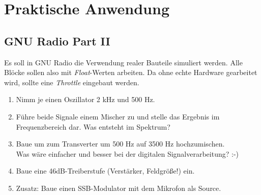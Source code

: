 \section{Praktische Anwendung}

\subsection{GNU Radio Part II}

Es soll in GNU Radio die Verwendung realer Bauteile simuliert werden. Alle
Blöcke sollen also mit \emph{Float}-Werten arbeiten. Da ohne echte Hardware
gearbeitet wird, sollte eine \emph{Throttle} eingebaut werden.

\begin{enumerate}
    \item Nimm je einen Oszillator 2 kHz und 500 Hz.
    \item Führe beide Signale einem Mischer zu und stelle das Ergebnis im
          Frequenzbereich dar. Was entsteht im Spektrum?
    \item Baue um zum Transverter um 500 Hz auf 3500 Hz hochzumischen. \\
          Was wäre einfacher und besser bei der digitalen Signalverarbeitung? :-)
    \item Baue eine 46dB-Treiberstufe (Verstärker, Feldgröße!) ein.
    \item Zusatz: Baue einen SSB-Modulator mit dem Mikrofon als Source.
\end{enumerate}


